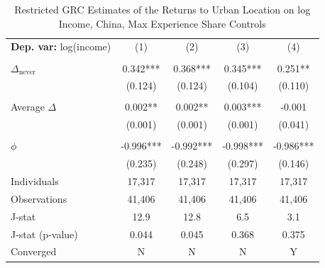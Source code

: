 \begin{table}[htbp] \centering \begin{threeparttable}
 \caption{Restricted GRC Estimates of the Returns to Urban Location on log Income, China, Max Experience Share Controls} 
 \label{tab:GRC_CHN_income_urban_unb_exp_m_sh} 
\begin{tabular}{l cccc} \toprule  \textbf{Dep. var:}  log(income) 
                    &\multicolumn{1}{c}{(1)}   &\multicolumn{1}{c}{(2)}   &\multicolumn{1}{c}{(3)}   &\multicolumn{1}{c}{(4)}   \\
                    &               &               &               &               \\
\addlinespace
$\Delta_{\text{never}}$&       0.342***&       0.368***&       0.345***&       0.251** \\
                    &     (0.124)   &     (0.124)   &     (0.104)   &     (0.110)   \\
                    &               &               &               &               \\
\addlinespace
Average $\Delta$    &       0.002** &       0.002** &       0.003***&      -0.001   \\
                    &     (0.001)   &     (0.001)   &     (0.001)   &     (0.041)   \\
                    &               &               &               &               \\
\addlinespace
$\phi$              &      -0.996***&      -0.992***&      -0.998***&      -0.986***\\
                    &     (0.235)   &     (0.248)   &     (0.297)   &     (0.146)   \\
\addlinespace
Individuals         &      17,317   &      17,317   &      17,317   &      17,317   \\
Observations        &      41,406   &      41,406   &      41,406   &      41,406   \\
J-stat              &        12.9   &        12.8   &         6.5   &         3.1   \\
J-stat (p-value)    &       0.044   &       0.045   &       0.368   &       0.375   \\
Converged           &           N   &           N   &           N   &           Y   \\

\end{tabular}
\end{threeparttable}
\end{table}
